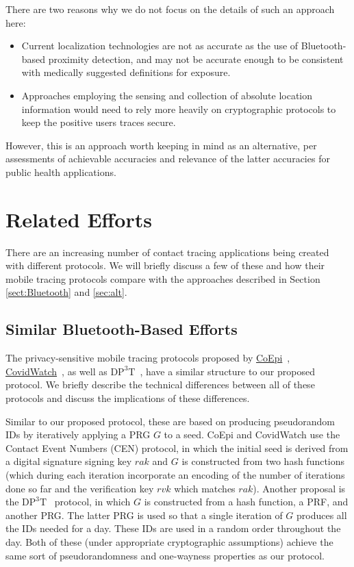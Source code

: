 \documentclass{article}
\begin{document}
There are two reasons why we do not focus on the details of such an approach here:
\begin{itemize}
    \item Current localization technologies are not as accurate as the use of Bluetooth-based proximity detection, and may not be accurate enough to be consistent with medically suggested definitions for exposure.
    \item Approaches employing the sensing and collection of absolute location information would need to rely more heavily on cryptographic protocols to keep the positive users traces secure.
\end{itemize}
However, this is an approach worth keeping in mind as an alternative, per assessments of achievable accuracies and relevance of the latter accuracies for public health applications.

\section{Related Efforts}
\label{sec:alternatives}
\label{sec:comparisons}

There are an increasing number of contact tracing applications being created with different protocols.
We will briefly discuss a few of these and how their mobile tracing protocols compare with the approaches described in Section \ref{sect:Bluetooth} and \ref{sec:alt}.

\subsection{Similar Bluetooth-Based Efforts}
The privacy-sensitive mobile tracing protocols proposed by
\href{https://www.coepi.org/}{CoEpi}~\cite{coepi},
\href{https://www.covid-watch.org/}{CovidWatch}~\cite{covidwatch},
as well as \href{https://github.com/DP-3T/documents}{$\mathrm{DP^3T}$}~\cite{dp3t}, 
have a similar structure to our proposed protocol.
We briefly describe the technical differences between all of these protocols and discuss the implications of these differences.

Similar to our proposed protocol, these are based on producing pseudorandom IDs by iteratively applying a PRG $G$ to a seed.
CoEpi and CovidWatch use the Contact Event Numbers (CEN) protocol, in which the initial seed is derived from a digital signature signing key $rak$ and $G$ is constructed from two hash functions (which during each iteration incorporate an encoding of the number of iterations done so far and the verification key $rvk$ which matches $rak$).
Another proposal is the $\mathrm{DP^3T}$~\cite{dp3t} protocol, in which $G$ is constructed from a hash function, a PRF, and another PRG.
The latter PRG is used so that a single iteration of $G$ produces all the IDs needed for a day.
These IDs are used in a random order throughout the day.
Both of these (under appropriate cryptographic assumptions) achieve the same sort of pseudorandomness and one-wayness properties as our protocol.
\end{document}
